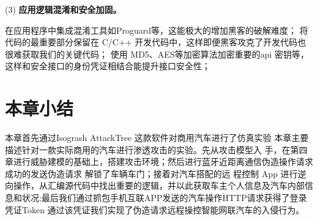 (3) \textbf{应用逻辑混淆和安全加固。} 

在应用程序中集成混淆工具如Proguard等，这能极大的增加黑客的破解难度；
将代码的最重要部分保留在 C/C++ 开发代码中，这样即便黑客攻克了开发代码也很难获取我们的关键代码；
使用 MD5、AES等加密算法加密重要的api 密钥等，这样和安全接口的身份凭证相结合能提升接口安全性；

\section{本章小结}
本章首先通过Isogrash AttackTree 这款软件对商用汽车进行了仿真实验
本章主要描述针对一款实际商用的汽车进行渗透攻击的实验。先从攻击模型入
手，在第四章进行威胁建模的基础上，搭建攻击环境；然后进行蓝牙近距离通信伪造操作请求 成功的发送伪造请求 解锁了车辆车门；接着对汽车搭配的远
程控制 App 进行逆向操作，从汇编源代码中找出重要的逻辑，并以此获取车主个人信息及汽车内部信息和状况;最后我们通过抓包手机互联APP发送的汽车操作HTTP请求获得了登录凭证Token
通过该凭证我们实现了伪造请求远程操控智能网联汽车的入侵行为。
